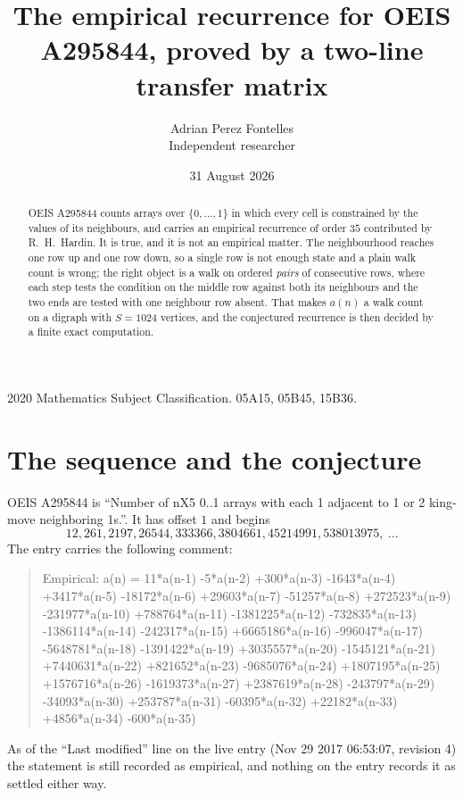 \documentclass[11pt,a4paper]{article}
\title{The empirical recurrence for OEIS A295844, proved by a two-line transfer matrix}
\author{Adrian Perez Fontelles\\ \small Independent researcher}
\date{31 August 2026}
\theoremstyle{plain}
\theoremstyle{definition}
\begin{document}
\maketitle

\begin{abstract}
OEIS A295844 counts arrays over $\{0,\dots,1\}$ in which every cell is constrained by the
values of its neighbours, and carries an empirical recurrence of order $35$ contributed
by R.~H.~Hardin. It is true, and it is not an empirical matter. The neighbourhood reaches one
row up and one row down, so a single row is not enough state and a plain walk count
is wrong; the right object is a walk on ordered \emph{pairs} of consecutive rows, where
each step tests the condition on the middle row against both its neighbours and the two
ends are tested with one neighbour row absent. That makes $a(n)$ a walk count on a digraph
with $S=1024$ vertices, and the conjectured recurrence is then decided by a finite exact
computation.
\end{abstract}

\noindent\small 2020 Mathematics Subject Classification. 05A15, 05B45, 15B36.\normalsize

\section{The sequence and the conjecture}

OEIS A295844 is ``Number of nX5 0..1 arrays with each 1 adjacent to 1 or 2 king-move neighboring 1s.''. It has offset $1$ and begins
\[
12, 261, 2197, 26544, 333366, 3804661, 45214991, 538013975,\ \dots
\]
The entry carries the following comment:
\begin{quote}\small
Empirical: a(n) = 11*a(n-1) -5*a(n-2) +300*a(n-3) -1643*a(n-4) +3417*a(n-5) -18172*a(n-6) +29603*a(n-7) -51257*a(n-8) +272523*a(n-9) -231977*a(n-10) +788764*a(n-11) -1381225*a(n-12) -732835*a(n-13) -1386114*a(n-14) -242317*a(n-15) +6665186*a(n-16) -996047*a(n-17) -5648781*a(n-18) -1391422*a(n-19) +3035557*a(n-20) -1545121*a(n-21) +7440631*a(n-22) +821652*a(n-23) -9685076*a(n-24) +1807195*a(n-25) +1576716*a(n-26) -1619373*a(n-27) +2387619*a(n-28) -243797*a(n-29) -34093*a(n-30) +253787*a(n-31) -60395*a(n-32) +22182*a(n-33) +4856*a(n-34) -600*a(n-35)
\end{quote}
As of the ``Last modified'' line on the live entry (Nov 29 2017 06:53:07, revision 4) the statement is
still recorded as empirical, and nothing on the entry records it as settled either way.
\end{document}
